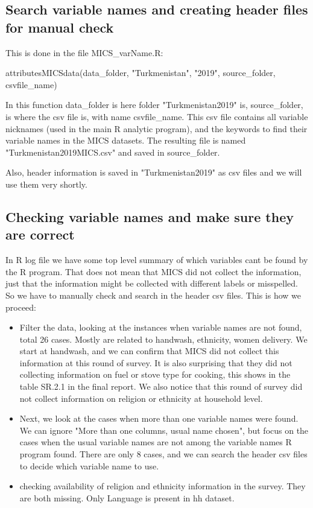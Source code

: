 \documentclass[12pt]{article}
\begin{document}
\subsection{Search variable names and creating header files for manual check}
This is done in the file MICS\_varName.R:

attributesMICSdata(data\_folder, "Turkmenistan", "2019", source\_folder, csvfile\_name)

In this function data\_folder is here folder "Turkmenistan2019" is,  source\_folder, is where the csv file is, with name csvfile\_name. This csv file contains all variable nicknames (used in the main R analytic program), and the keywords to find their variable names in the MICS datasets.  The resulting file is named "Turkmenistan2019MICS.csv" and saved in source\_folder. 

Also, header information is saved in "Turkmenistan2019" as csv files and we will use them very shortly.

\subsection{Checking variable names and make sure they are correct}
In R log file we have some top level summary of which variables cant be found by the R program. That does not mean that MICS did not collect the information, just that the information might be collected with different labels or misspelled. So we have to manually check and search in the header csv files. This is how we proceed:

\begin{itemize}
	\item Filter the data, looking at the instances when variable names are not found, total 26 cases. Mostly are related to handwash, ethnicity, women delivery. We start at handwash, and we can confirm that MICS did not collect this information at this round of survey. It is also surprising that they did not collecting information on fuel or stove type for cooking, this shows in the table SR.2.1 in the final report. We also notice that this round of survey did not collect information on religion or ethnicity at household level. 
	\item Next, we look at the cases when more than one variable names were found. We can ignore "More than one columns, usual name chosen", but focus on the cases when the usual variable names are not among the variable names R program found. There are only 8 cases, and we can search the header csv files to decide which variable name to use.	
	\item checking availability of religion and ethnicity information in the survey. They are both missing. Only Language is present in hh dataset.
\end{itemize}
\end{document}
